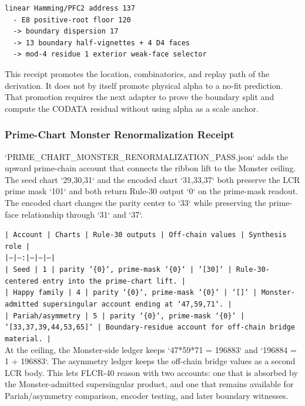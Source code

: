 \documentclass[11pt]{article}
\begin{document}
\begin{verbatim}
linear Hamming/PFC2 address 137
  - E8 positive-root floor 120
  -> boundary dispersion 17
  -> 13 boundary half-vignettes + 4 D4 faces
  -> mod-4 residue 1 exterior weak-face selector
\end{verbatim}

This receipt promotes the location, combinatorics, and replay path of the derivation. It does not by itself promote physical alpha to a no-fit prediction. That promotion requires the next adapter to prove the boundary split and compute the CODATA residual without using alpha as a scale anchor.

\subsubsection*{Prime-Chart Monster Renormalization Receipt}

`PRIME\_CHART\_MONSTER\_RENORMALIZATION\_PASS.json` adds the upward prime-chain
account that connects the ribbon lift to the Monster ceiling. The seed chart
`29,30,31` and the encoded chart `31,33,37` both preserve the LCR prime mask
`101` and both return Rule-30 output `0` on the prime-mask readout. The
encoded chart changes the parity center to `33` while preserving the prime-face
relationship through `31` and `37`.

\noindent\texttt{| Account | Charts | Rule-30 outputs | Off-chain values | Synthesis role |}\\
\noindent\texttt{|---|---:|---|---|---|}\\
\noindent\texttt{| Seed | 1 | parity `\{0\}`, prime-mask `\{0\}` | `[30]` | Rule-30-centered entry into the prime-chart lift. |}\\
\noindent\texttt{| Happy family | 4 | parity `\{0\}`, prime-mask `\{0\}` | `[]` | Monster-admitted supersingular account ending at `47,59,71`. |}\\
\noindent\texttt{| Pariah/asymmetry | 5 | parity `\{0\}`, prime-mask `\{0\}` | `[33,37,39,44,53,65]` | Boundary-residue account for off-chain bridge material. |}\\

At the ceiling, the Monster-side ledger keeps
`47*59*71 = 196883` and `196884 = 1 + 196883`. The asymmetry ledger keeps
the off-chain bridge values as a second LCR body. This lets FLCR-40 reason
with two accounts: one that is absorbed by the Monster-admitted supersingular
product, and one that remains available for Pariah/asymmetry comparison,
encoder testing, and later boundary witnesses.
\end{document}
